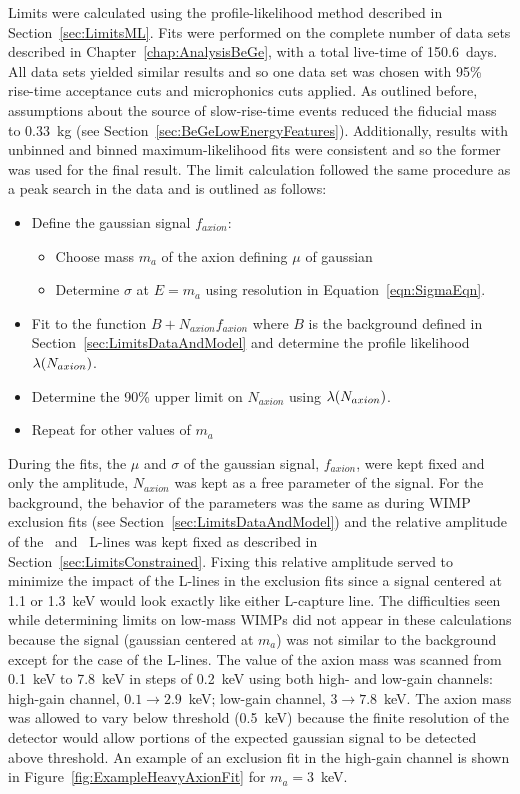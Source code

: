	Limits were calculated using the profile-likelihood method described in Section~\ref{sec:LimitsML}.  Fits were performed on the complete number of data sets described in Chapter~\ref{chap:AnalysisBeGe}, with a total live-time of 150.6~days.  All data sets yielded similar results and so one data set was chosen with 95\% rise-time acceptance cuts and microphonics cuts applied.  As outlined before, assumptions about the source of slow-rise-time events reduced the fiducial mass to 0.33~kg (see Section~\ref{sec:BeGeLowEnergyFeatures}).  Additionally, results with unbinned and binned maximum-likelihood fits were consistent and so the former was used for the final result.  The limit calculation followed the same procedure as a peak search in the data and is outlined as follows:
		\begin{itemize}
			\item Define the gaussian signal $f_{axion}$: 
			\begin{itemize}
				\item Choose mass $m_{a}$ of the axion defining $\mu$ of gaussian
				\item Determine $\sigma$ at $E = m_{a}$ using resolution in Equation~\ref{eqn:SigmaEqn}.
			\end{itemize}
			\item Fit to the function $B + N_{axion} f_{axion}$ where $B$ is the background defined in Section~\ref{sec:LimitsDataAndModel} and determine the profile likelihood $\lambda(N_{axion})$.
			\item Determine the 90\% upper limit on $N_{axion}$ using $\lambda(N_{axion})$.
			\item Repeat for other values of $m_{a}$
		\end{itemize}		
	
	During the fits, the $\mu$ and $\sigma$ of the gaussian signal, $f_{axion}$, were kept fixed and only the amplitude, $N_{axion}$ was kept as a free parameter of the signal.  For the background, the behavior of the parameters was the same as during WIMP exclusion fits (see Section~\ref{sec:LimitsDataAndModel}) and the relative amplitude of the \gersixeight~and \znsixfive~L-lines was kept fixed as described in Section~\ref{sec:LimitsConstrained}.  Fixing this relative amplitude served to minimize the impact of the L-lines in the exclusion fits since a signal centered at 1.1 or 1.3~keV would look exactly like either L-capture line.  The difficulties seen while determining limits on low-mass WIMPs did not appear in these calculations because the signal (gaussian centered at $m_{a}$) was not similar to the background except for the case of the L-lines.  The value of the axion mass was scanned from 0.1~keV to 7.8~keV in steps of 0.2~keV using both high- and low-gain channels: high-gain channel, $0.1\to2.9$~keV; low-gain channel, $3\to7.8$~keV.  The axion mass was allowed to vary below threshold (0.5~keV) because the finite resolution of the detector would allow portions of the expected gaussian signal to be detected above threshold.  An example of an exclusion fit in the high-gain channel is shown in Figure~\ref{fig:ExampleHeavyAxionFit} for $m_{a}=3$~keV.  

